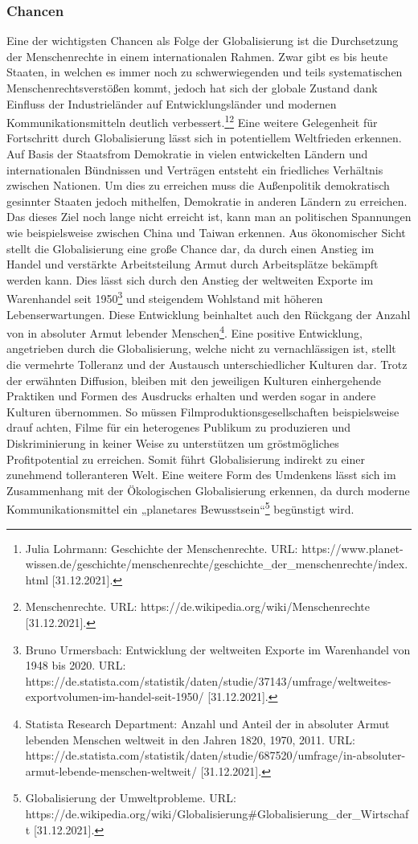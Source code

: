 \documentclass[12pt]{article}
\begin{document}
\subsubsection{Chancen}
Eine der wichtigsten Chancen als Folge der Globalisierung ist die Durchsetzung der Menschenrechte in einem internationalen Rahmen. Zwar gibt es bis heute Staaten, in welchen es immer noch zu schwerwiegenden und teils systematischen Menschenrechtsverstößen kommt, jedoch hat sich der globale Zustand dank Einfluss der Industrieländer auf Entwicklungsländer und modernen Kommunikationsmitteln deutlich verbessert.\footnote{ Julia Lohrmann: Geschichte der Menschenrechte. URL: https://www.planet-wissen.de/geschichte/menschenrechte/geschichte_der_menschenrechte/index.html [31.12.2021].}\footnote{Menschenrechte. URL: https://de.wikipedia.org/wiki/Menschenrechte [31.12.2021].} 
Eine weitere Gelegenheit für Fortschritt durch Globalisierung lässt sich in potentiellem Weltfrieden erkennen. Auf Basis der Staatsfrom Demokratie in vielen entwickelten Ländern und internationalen Bündnissen und Verträgen entsteht ein friedliches Verhältnis zwischen Nationen. Um dies zu erreichen muss die Außenpolitik demokratisch gesinnter Staaten jedoch mithelfen, Demokratie in anderen Ländern zu erreichen. Das dieses Ziel noch lange nicht erreicht ist, kann man an politischen Spannungen wie beispielsweise zwischen China und Taiwan erkennen.
Aus ökonomischer Sicht stellt die Globalisierung eine große Chance dar, da durch einen Anstieg im Handel und verstärkte Arbeitsteilung Armut durch Arbeitsplätze bekämpft werden kann. Dies lässt sich durch den Anstieg der weltweiten Exporte im Warenhandel seit 1950\footnote{Bruno Urmersbach: Entwicklung der weltweiten Exporte im Warenhandel von 1948 bis 2020. URL: https://de.statista.com/statistik/daten/studie/37143/umfrage/weltweites-exportvolumen-im-handel-seit-1950/ [31.12.2021].} und steigendem Wohlstand mit höheren Lebenserwartungen. Diese Entwicklung beinhaltet auch den Rückgang der Anzahl von in absoluter Armut lebender Menschen\footnote{Statista Research Department: Anzahl und Anteil der in absoluter Armut lebenden Menschen weltweit in den Jahren 1820, 1970, 2011. URL: https://de.statista.com/statistik/daten/studie/687520/umfrage/in-absoluter-armut-lebende-menschen-weltweit/ [31.12.2021].}.
Eine positive Entwicklung, angetrieben durch die Globalisierung, welche nicht zu vernachlässigen ist, stellt die vermehrte Tolleranz und der Austausch unterschiedlicher Kulturen dar. Trotz der erwähnten Diffusion, bleiben mit den jeweiligen Kulturen einhergehende Praktiken und Formen des Ausdrucks erhalten und werden sogar in andere Kulturen übernommen. So müssen Filmproduktionsgesellschaften beispielsweise drauf achten, Filme für ein heterogenes Publikum zu produzieren und Diskriminierung in keiner Weise zu unterstützen um gröstmögliches Profitpotential zu erreichen. Somit führt Globalisierung indirekt zu einer zunehmend tolleranteren Welt. Eine weitere Form des Umdenkens lässt sich im Zusammenhang mit der Ökologischen Globalisierung erkennen, da durch moderne Kommunikationsmittel ein „planetares Bewusstsein“\footnote{Globalisierung der Umweltprobleme. URL: https://de.wikipedia.org/wiki/Globalisierung#Globalisierung_der_Wirtschaft [31.12.2021].} begünstigt wird.
\end{document}
